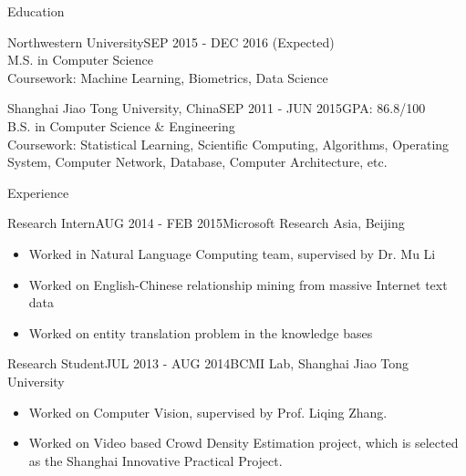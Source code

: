 \documentclass{resume} %
\begin{document}

\begin{rSection}{Education}
\begin{rSubsection}{Northwestern University}{SEP 2015 - DEC 2016 (Expected)}{}\\
M.S. in Computer Science\\
Coursework: Machine Learning, Biometrics, Data Science
\end{rSubsection}
\vspace{5pt}
\begin{rSubsection}{Shanghai Jiao Tong University, China}{SEP 2011 - JUN 2015}{\quad GPA: {86.8/100}}\\
B.S. in Computer Science \& Engineering\\
Coursework: Statistical Learning, Scientific Computing, Algorithms,  Operating System, Computer Network, Database, Computer Architecture, etc.
\end{rSubsection}
\end{rSection}
\vspace{10pt}

\begin{rSection}{Experience}
\begin{rSubsection}{Research Intern}{AUG 2014 - FEB 2015}{Microsoft Research Asia, Beijing}
\begin{itemize}
\item Worked in Natural Language Computing team, supervised by Dr. Mu Li
\item Worked on English-Chinese relationship mining from massive Internet text data
\item Worked on entity translation problem in the knowledge bases
\end{itemize}
\end{rSubsection}
\vspace{5pt}
\begin{rSubsection}{Research Student}{JUL 2013 - AUG 2014}{BCMI Lab, Shanghai Jiao Tong University}
\begin{itemize}
\item Worked on Computer Vision, supervised by Prof. Liqing Zhang.
\item Worked on Video based Crowd Density Estimation project, which is selected as the Shanghai Innovative Practical Project.
\end{itemize}
\end{rSubsection}
\end{rSection}
\vspace{10pt}
\end{document}
